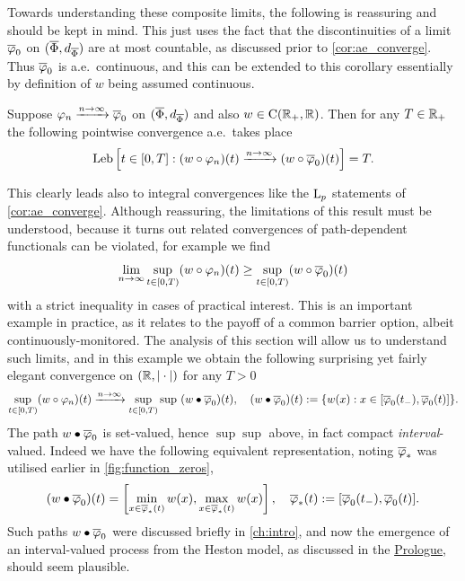 Towards understanding these composite limits, the following is reassuring and should be kept in mind. This just uses the fact that the discontinuities of a limit $\overline{\varphi}_0$ on $(\overline{\Phi},d_{\overline{\Phi}})$ are at most countable, as discussed prior to \autoref{cor:ae_converge}. Thus $\overline{\varphi}_0$ is a.e.~continuous, and this can be extended to this corollary essentially by definition of $w$ being assumed continuous.
\begin{corollary}\label{cor:ae_composite}
    Suppose $\varphi_n\xrightarrow{n\to\infty}\overline{\varphi}_0$ on $(\overline{\Phi},d_{\overline{\Phi}})$ and also $w\in\mathrm{C}(\mathbb{R}_+,\mathbb{R})$. Then for any $T\in\mathbb{R}_+$ the following pointwise convergence a.e.~takes place
    \begin{equation}
        \operatorname*{Leb}\left[t\in[0,T]: (w\circ\varphi_n)(t)\xrightarrow{n\to\infty}(w\circ\overline{\varphi}_0)(t)\right] =T.
    \end{equation}
\end{corollary}
This clearly leads also to integral convergences like the $\mathrm{L}_p$ statements of \autoref{cor:ae_converge}. Although reassuring, the limitations of this result must be understood, because it turns out related convergences of path-dependent functionals can be violated, for example we find
\begin{equation}\label{eq:barrier_violation}
    \lim_{n\to\infty}\sup_{t\in[0,T)}(w\circ\varphi_n)(t) \ge \sup_{t\in[0,T)}(w\circ\overline{\varphi}_0)(t)
\end{equation}
with a strict inequality in cases of practical interest. This is an important example in practice, as it relates to the payoff of a common barrier option, albeit continuously-monitored. The analysis of this section will allow us to understand such limits, and in this example we obtain the following surprising yet fairly elegant convergence on $(\mathbb{R},|\cdot|)$ for any $T>0$
\begin{equation}\label{eq:def_barrier}
    \sup_{t\in[0,T)}(w\circ\varphi_n)(t) \xrightarrow{n\to\infty} \sup_{t\in[0,T)}\sup\ (w\bullet\overline{\varphi}_0)(t),\quad (w\bullet\overline{\varphi}_0)(t) := \{w(x):x\in[\overline{\varphi}_0(t_-),\overline{\varphi}_0(t)]\}.
\end{equation}
The path $w\bullet\overline{\varphi}_0$ is set-valued, hence $\sup\sup$ above, in fact compact \emph{interval}-valued. Indeed we have the following equivalent representation, noting $\overline{\varphi}_*$ was utilised earlier in \autoref{fig:function_zeros},
\begin{equation}
    (w\bullet\overline{\varphi}_0)(t) = \left[\min_{x\in\overline{\varphi}_*(t)}w(x),\max_{x\in\overline{\varphi}_*(t)}w(x)\right],\quad \overline{\varphi}_*(t):=[\overline{\varphi}_0(t_-),\overline{\varphi}_0(t)].
\end{equation}
Such paths $w\bullet\overline{\varphi}_0$ were discussed briefly in \autoref{ch:intro}, and now the emergence of an interval-valued process from the Heston model, as discussed in the \hyperlink{prologue}{Prologue}, should seem plausible.

